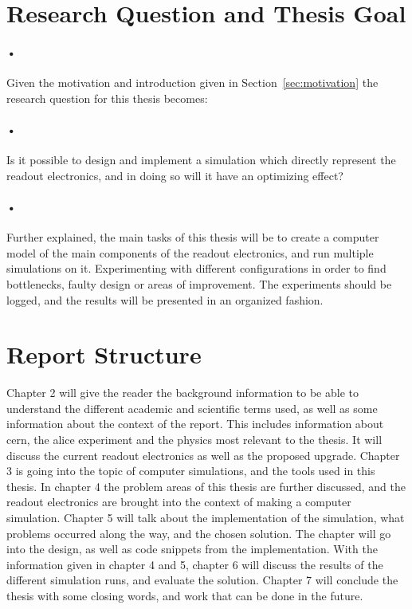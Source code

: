 \documentclass[a4paper, 12pt, openright, twoside]{report}
\begin{document}
\section{Research Question and Thesis Goal}

\paragraph{•}
Given the motivation and introduction given in Section~\ref{sec:motivation} the research question for this thesis becomes:

\paragraph{•}
Is it possible to design and implement a simulation which directly represent the readout electronics, and in doing so will it have an optimizing effect?

\paragraph{•}
Further explained, the main tasks of this thesis will be to create a computer model of the main components of the readout electronics, and run multiple simulations on it.
Experimenting with different configurations in order to find bottlenecks, faulty design or areas of improvement.
The experiments should be logged, and the results will be presented in an organized fashion.


\section{Report Structure}
Chapter 2 will give the reader the background information to be able to understand the different academic and scientific terms used, as well as some information about the context of the report.
This includes information about \gls{cern}, the \gls{alice} experiment and the physics most relevant to the thesis.
It will discuss the current readout electronics as well as the proposed upgrade.
Chapter 3 is going into the topic of computer simulations, and the tools used in this thesis.
In chapter 4 the problem areas of this thesis are further discussed, and the readout electronics are brought into the context of making a computer simulation.
Chapter 5 will talk about the implementation of the simulation, what problems occurred along the way, and the chosen solution.
The chapter will go into the design, as well as code snippets from the implementation.
With the information given in chapter 4 and 5, chapter 6 will discuss the results of the different simulation runs, and evaluate the solution.
Chapter 7 will conclude the thesis with some closing words, and work that can be done in the future.
\end{document}

